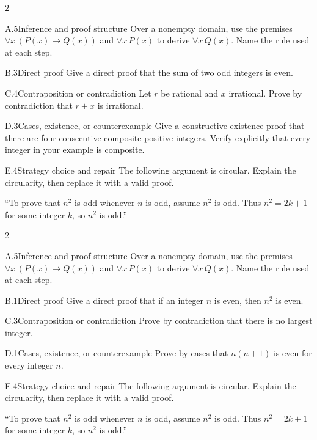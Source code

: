\documentclass[9pt]{extarticle}
\begin{document}
\begin{multicols}{2}
\begin{CoreProblem}{A.5}{Inference and proof structure}
Over a nonempty domain, use the premises
$\forall x\,(P(x)\to Q(x))$ and $\forall x\,P(x)$ to derive
$\forall x\,Q(x)$. Name the rule used at each step.
\end{CoreProblem}
\begin{CoreProblem}{B.3}{Direct proof}
Give a direct proof that the sum of two odd integers is even.
\end{CoreProblem}
\begin{CoreProblem}{C.4}{Contraposition or contradiction}
Let $r$ be rational and $x$ irrational. Prove by contradiction that $r+x$ is irrational.
\end{CoreProblem}
\columnbreak
\begin{CoreProblem}{D.3}{Cases, existence, or counterexample}
Give a constructive existence proof that there are four consecutive composite
positive integers. Verify explicitly that every integer in your example is
composite.
\end{CoreProblem}
\begin{CoreProblem}{E.4}{Strategy choice and repair}
The following argument is circular. Explain the circularity, then replace it with a valid proof.

``To prove that $n^2$ is odd whenever $n$ is odd, assume $n^2$ is odd. Thus
$n^2=2k+1$ for some integer $k$, so $n^2$ is odd.''
\end{CoreProblem}
\end{multicols}
\CoreWorkArea
\FormBreak
{}
\begin{multicols}{2}
\begin{CoreProblem}{A.5}{Inference and proof structure}
Over a nonempty domain, use the premises
$\forall x\,(P(x)\to Q(x))$ and $\forall x\,P(x)$ to derive
$\forall x\,Q(x)$. Name the rule used at each step.
\end{CoreProblem}
\begin{CoreProblem}{B.1}{Direct proof}
Give a direct proof that if an integer $n$ is even, then $n^2$ is even.
\end{CoreProblem}
\begin{CoreProblem}{C.3}{Contraposition or contradiction}
Prove by contradiction that there is no largest integer.
\end{CoreProblem}
\columnbreak
\begin{CoreProblem}{D.1}{Cases, existence, or counterexample}
Prove by cases that $n(n+1)$ is even for every integer $n$.
\end{CoreProblem}
\begin{CoreProblem}{E.4}{Strategy choice and repair}
The following argument is circular. Explain the circularity, then replace it with a valid proof.

``To prove that $n^2$ is odd whenever $n$ is odd, assume $n^2$ is odd. Thus
$n^2=2k+1$ for some integer $k$, so $n^2$ is odd.''
\end{CoreProblem}
\end{multicols}
\end{document}
